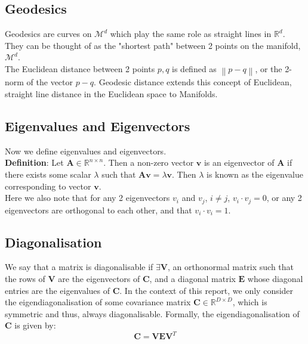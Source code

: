 \documentclass[12pt]{report}
\newcommand\norm[1]{\left\lVert#1\right\rVert}
\begin{document}
\subsection{Geodesics}

Geodesics are curves on $\mathcal{M}^d$
which play the same role as straight
lines in $\mathbb{R}^d$. They can be thought of as the "shortest path"
between 2 points on the manifold, $\mathcal{M}^d$.\\

The Euclidean distance between 2 points $p, q$ 
is defined as $\norm{p-q}$, or the 2-norm of the vector $p - q$.
Geodesic distance extends this concept of Euclidean, straight line distance
in the Euclidean space to Manifolds. 


\subsection{Eigenvalues and Eigenvectors}
Now we define eigenvalues and eigenvectors.\\
\textbf{Definition}: Let $\mathbf{A} \in \mathbb{R}^{n \times n}$. 
Then a non-zero vector $\mathbf{v}$ is an eigenvector of $\mathbf{A}$ 
if there exists some scalar $\lambda$ such that $\mathbf{A}\mathbf{v} = \lambda \mathbf{v}$. 
Then $\lambda$ is known as the eigenvalue corresponding to vector $\mathbf{v}$.\\
Here we also note that for any 2 eigenvectors $v_i$ and $v_j$, $i \neq j$, $v_i \cdot v_j = 0$, 
or any 2 eigenvectors are orthogonal to each other, and that $v_i \cdot v_i = 1$.

\subsection{Diagonalisation}
We say that a matrix is diagonalisable if $\exists \mathbf{V}$, 
an orthonormal matrix such that the rows of $\mathbf{V}$ 
are the eigenvectors of $\mathbf{C}$, and a diagonal matrix 
$\mathbf{E}$ whose diagonal entries are the eigenvalues of $\mathbf{C}$.
In the context of this report, we only consider 
the eigendiagonalisation of some covariance matrix 
$\mathbf{C} \in \mathbb{R}^{D \times D}$,
which is symmetric and thus, always diagonalisable. Formally,
the eigendiagonalisation of $\mathbf{C}$ is given by:
$$\mathbf{C} = \mathbf{V}\mathbf{E}\mathbf{V}^T$$
\end{document}
